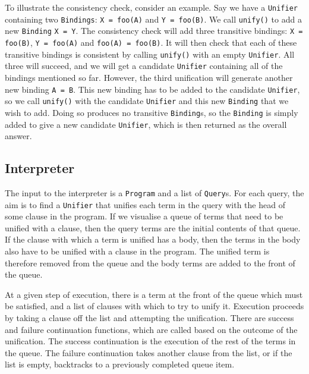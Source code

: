 \documentclass[12pt]{article}
\begin{document}
To illustrate the consistency check, consider an example. 
Say we have a \verb|Unifier| containing two \verb|Bindings|: \verb|X = foo(A)| and \verb|Y = foo(B)|. 
We call \verb|unify()| to add a new \verb|Binding| \verb|X = Y|. 
The consistency check will add three transitive bindings: \verb|X = foo(B)|, \verb|Y = foo(A)| and \verb|foo(A) = foo(B)|. 
It will then check that each of these transitive bindings is consistent by calling \verb|unify()| with an empty \verb|Unifier|. 
All three will succeed, and we will get a candidate \verb|Unifier| containing all of the bindings mentioned so far.
However, the third unification will generate another new binding \verb|A = B|. 
This new binding has to be added to the candidate \verb|Unifier|, so we call \verb|unify()| with the candidate \verb|Unifier| and this new \verb|Binding| that we wish to add.
Doing so produces no transitive \verb|Binding|s, so the \verb|Binding| is simply added to give a new candidate \verb|Unifier|, which is then returned as the overall answer.


\subsection{Interpreter}

The input to the interpreter is a \verb|Program| and a list of \verb|Query|s. 
For each query, the aim is to find a \verb|Unifier| that unifies each term in the query with the head of some clause in the program. 
If we visualise a queue of terms that need to be unified with a clause, then the query terms are the initial contents of that queue. 
If the clause with which a term is unified has a body, then the terms in the body also have to be unified with a clause in the program.
The unified term is therefore removed from the queue and the body terms are added to the front of the queue.


At a given step of execution, there is a term at the front of the queue which must be satisfied, and a list of clauses with which to try to unify it. 
Execution proceeds by taking a clause off the list and attempting the unification. 
There are success and failure continuation functions, which are called based on the outcome of the unification.
The success continuation is the execution of the rest of the terms in the queue. The failure continuation takes another clause from the list, or if the list is empty, backtracks to a previously completed queue item.
\end{document}
